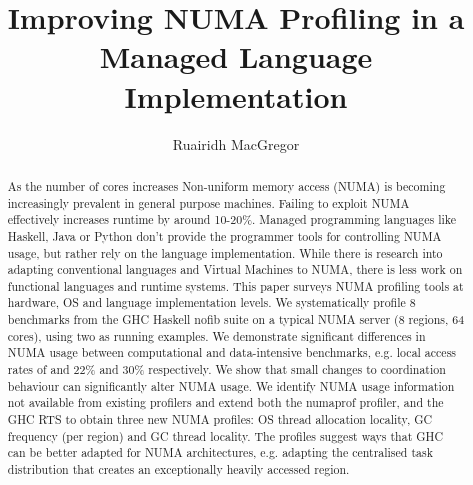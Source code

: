 \documentclass{paper}\usepackage{graphicx}
\begin{document}

\title{Improving NUMA Profiling in a Managed Language Implementation}
\author{Ruairidh MacGregor}
\date{}

\maketitle

\begin{abstract}
As the number of cores increases Non-uniform memory access (NUMA) is becoming increasingly prevalent in general purpose machines. Failing to exploit NUMA effectively increases runtime by around 10-20\%. Managed programming languages like Haskell, Java or Python don’t provide the programmer tools for controlling NUMA usage, but rather rely on the language implementation. While there is research into adapting conventional languages and Virtual Machines to NUMA, there is less work on functional languages and runtime systems. This paper surveys NUMA profiling tools at hardware, OS and language implementation levels. We systematically profile 8 benchmarks from the GHC Haskell nofib suite on a typical NUMA server (8 regions, 64 cores), using two as running examples. We demonstrate significant differences in NUMA usage between computational and data-intensive benchmarks, e.g.  local access rates of and 22\% and 30\% respectively. We show that small changes to coordination behaviour can significantly alter NUMA usage. We identify NUMA usage information not available from existing profilers and extend both the numaprof profiler, and the GHC RTS to obtain three new NUMA profiles:  OS thread allocation locality,  GC frequency (per region) and GC thread locality. The profiles suggest ways that GHC can be better adapted for NUMA architectures, e.g. adapting the centralised task distribution that creates an exceptionally heavily accessed region.

\end{abstract}
\end{document}
